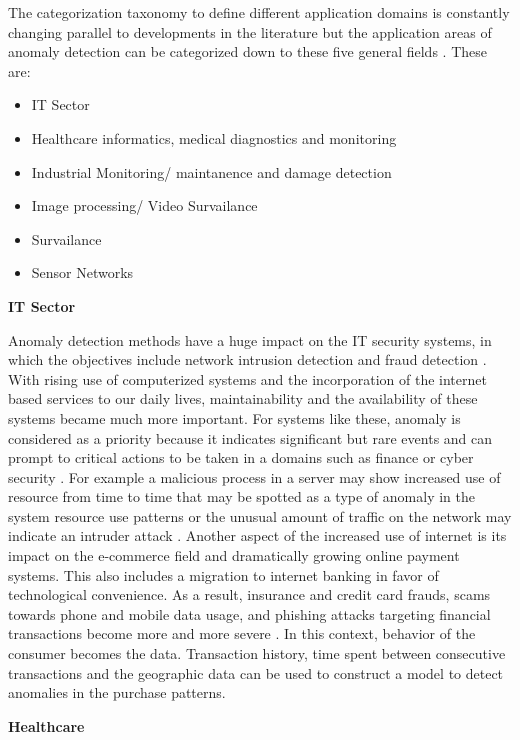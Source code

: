 The categorization taxonomy to define different application domains is constantly changing 
parallel to developments in the literature but the application areas of 
anomaly detection can be categorized down to these five general fields
\cite{Pimentel:2014:RRN:2588908.2589196}.
These are:
\begin{itemize}
    \item IT Sector 
    \item Healthcare informatics, medical diagnostics and monitoring
    \item Industrial Monitoring/ maintanence and damage detection
    \item Image processing/ Video Survailance
    \item Survailance
    \item Sensor Networks
\end{itemize}

\textbf{ IT Sector}

Anomaly detection methods have a huge impact on the IT security systems, in which the objectives
include network intrusion detection and fraud detection \cite{Pimentel:2014:RRN:2588908.2589196}.
With rising use of computerized systems and the incorporation of the internet based services to
our daily lives, maintainability and the availability of these systems became much more important.
For systems like these, anomaly is considered as a priority because it indicates significant but
rare events and can prompt to critical actions to be taken in a domains such as finance or cyber security
\cite{AHMED201619}. For example a malicious process in a server may show increased use of resource
from time to time that may be spotted as a type of anomaly in the system resource use patterns or
the unusual amount of traffic on the network may indicate an intruder attack \cite{FERNANDES20161}
\cite{JABEZ2015338}. Another aspect of the increased use of internet is its impact on the e-commerce
field and dramatically growing online payment systems. This also includes a migration to internet
banking in favor of technological convenience. As a result, insurance and credit card frauds,
scams towards phone and mobile data usage, and phishing attacks targeting financial transactions
become more and more severe \cite{finance_anomaly}. In this context, behavior of the consumer
becomes the data. Transaction history, time spent between consecutive transactions and the
geographic data can be used to construct a model to detect anomalies in the purchase patterns.

\textbf{ Healthcare}

